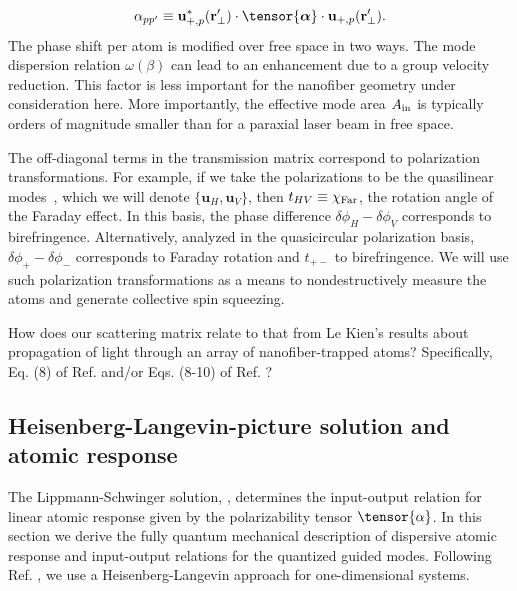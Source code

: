 \documentclass[preprint,aps,pra,onecolumn]{revtex4-1} %
\begin{document}
	\begin{align}
		\alpha_{pp'} \equiv \mathbf{u}^*_{+,p}(\br'_\perp) \cdot \tensor{\boldsymbol{\alpha}}\cdot \mathbf{u}_{+, p}(\br'_\perp). \label{Eq::ModeAreaImplicit}
	\end{align} 
The phase shift per atom is modified over free space in two ways.  The mode dispersion relation 
 $\omega(\beta)$ can lead to an enhancement due to a group velocity reduction. This factor is less 
 important for the nanofiber geometry under consideration here.  More importantly, the effective mode 
 area $A_{\rm in}$ is typically orders of magnitude smaller than for a paraxial laser beam in free space.  
 
 The off-diagonal terms in the transmission matrix correspond to polarization transformations.  For 
 example, if we take the polarizations to be the quasilinear modes~\cite{?}, which we will denote $\{ 
 \mathbf{u}_{H}, \mathbf{u}_{V}\}$, then $t_{HV} \equiv \chi_{\rm Far}$,  the rotation angle of the Faraday 
 effect.  In this basis, the phase difference $\delta  \phi_H - \delta \phi_V$ corresponds to birefringence.  
 Alternatively, analyzed in the quasicircular polarization basis, $\delta \phi_+ -\delta  \phi_-$ corresponds 
 to Faraday rotation and $t_{+-}$ to birefringence.  We will use such polarization transformations as a means to nondestructively measure the atoms and generate collective spin squeezing.

{\color{blue} How does our scattering matrix relate to that from Le Kien's results about propagation of light through an array of nanofiber-trapped atoms?  Specifically, Eq. (8) of Ref. \cite{le_kien_correlations_2008} and/or Eqs. (8-10) of Ref. \cite{le_kien_propagation_2014}?  
}

\subsection{Heisenberg-Langevin-picture solution and atomic response}
The Lippmann-Schwinger solution, , determines the input-output relation for linear atomic response given by the polarizability tensor $\tensor{\alpha}$.  In this section we derive the fully quantum mechanical description of dispersive atomic response and input-output relations for the quantized guided modes.  Following Ref. \cite{le_kien_spontaneous_2005}, we use a Heisenberg-Langevin approach for one-dimensional systems.  
\end{document}

